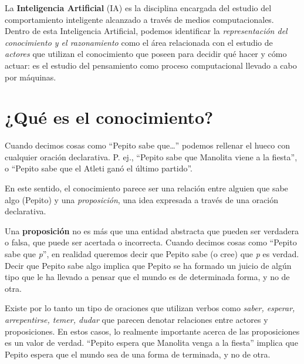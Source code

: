 \documentclass{tufte-handout}
\begin{document}
La \textbf{Inteligencia Artificial} (IA) es la
disciplina
encargada del estudio del comportamiento inteligente alcanzado a través
de medios computacionales. Dentro de esta Inteligencia Artificial,
podemos identificar la \emph{representación del conocimiento y el
razonamiento} como el área relacionada con el estudio de \emph{actores}
que utilizan el conocimiento que poseen para decidir qué hacer y cómo
actuar: es el estudio del pensamiento como proceso computacional llevado
a cabo por máquinas.

\section{¿Qué es el conocimiento?
}\label{que-es-el-conocimiento}

Cuando decimos cosas como ``Pepito sabe que\ldots{}'' podemos rellenar
el hueco con cualquier oración declarativa. P. ej., ``Pepito sabe que
Manolita viene a la fiesta'', o ``Pepito sabe que el Atleti ganó el
último partido''.

En este sentido, el conocimiento parece ser una relación entre alguien
que sabe algo (Pepito) y una \emph{proposición}, una idea expresada a
través de una oración declarativa.

Una \textbf{proposición} no es más que una entidad abstracta que pueden
ser verdadera o falsa, que puede ser acertada o incorrecta. Cuando
decimos cosas como ``Pepito sabe que \emph{p}'', en realidad queremos
decir que Pepito sabe (o cree) que \emph{p} es
verdad.
Decir que Pepito sabe algo implica que Pepito se ha formado un juicio de
algún tipo que le ha llevado a pensar que el mundo es de determinada
forma, y no de otra.

Existe por lo tanto un tipo de oraciones que utilizan verbos como
\emph{saber, esperar, arrepentirse, temer,
dudar}
que parecen denotar relaciones entre actores y proposiciones. En estos
casos, lo realmente importante acerca de las proposiciones es un valor
de verdad. ``Pepito espera que Manolita venga a la fiesta'' implica que
Pepito espera que el mundo sea de una forma de terminada, y no de otra.
\end{document}
